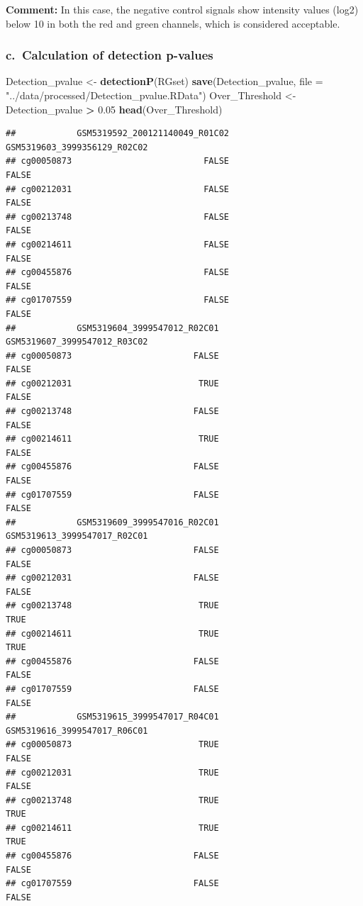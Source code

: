 \documentclass[
  11pt,
]{article}
\newenvironment{Shaded}{\begin{snugshade}}{\end{snugshade}}
\newcommand{\AttributeTok}[1]{\textcolor[rgb]{0.13,0.29,0.53}{#1}}
\newcommand{\FloatTok}[1]{\textcolor[rgb]{0.00,0.00,0.81}{#1}}
\newcommand{\FunctionTok}[1]{\textcolor[rgb]{0.13,0.29,0.53}{\textbf{#1}}}
\newcommand{\NormalTok}[1]{#1}
\newcommand{\OtherTok}[1]{\textcolor[rgb]{0.56,0.35,0.01}{#1}}
\newcommand{\SpecialCharTok}[1]{\textcolor[rgb]{0.81,0.36,0.00}{\textbf{#1}}}
\newcommand{\StringTok}[1]{\textcolor[rgb]{0.31,0.60,0.02}{#1}}
\begin{document}
\textbf{Comment:} In this case, the negative control signals show
intensity values (log2) below 10 in both the red and green channels,
which is considered acceptable.

\subsubsection{c.~Calculation of detection
p-values}\label{c.-calculation-of-detection-p-values}

\begin{Shaded}
\begin{Highlighting}[]
\NormalTok{Detection\_pvalue }\OtherTok{\textless{}{-}} \FunctionTok{detectionP}\NormalTok{(RGset)}
\FunctionTok{save}\NormalTok{(Detection\_pvalue, }\AttributeTok{file =} \StringTok{"../data/processed/Detection\_pvalue.RData"}\NormalTok{)}
\NormalTok{Over\_Threshold }\OtherTok{\textless{}{-}}\NormalTok{ Detection\_pvalue }\SpecialCharTok{\textgreater{}} \FloatTok{0.05}
\FunctionTok{head}\NormalTok{(Over\_Threshold)}
\end{Highlighting}
\end{Shaded}

\begin{verbatim}
##            GSM5319592_200121140049_R01C02 GSM5319603_3999356129_R02C02
## cg00050873                          FALSE                        FALSE
## cg00212031                          FALSE                        FALSE
## cg00213748                          FALSE                        FALSE
## cg00214611                          FALSE                        FALSE
## cg00455876                          FALSE                        FALSE
## cg01707559                          FALSE                        FALSE
##            GSM5319604_3999547012_R02C01 GSM5319607_3999547012_R03C02
## cg00050873                        FALSE                        FALSE
## cg00212031                         TRUE                        FALSE
## cg00213748                        FALSE                        FALSE
## cg00214611                         TRUE                        FALSE
## cg00455876                        FALSE                        FALSE
## cg01707559                        FALSE                        FALSE
##            GSM5319609_3999547016_R02C01 GSM5319613_3999547017_R02C01
## cg00050873                        FALSE                        FALSE
## cg00212031                        FALSE                        FALSE
## cg00213748                         TRUE                         TRUE
## cg00214611                         TRUE                         TRUE
## cg00455876                        FALSE                        FALSE
## cg01707559                        FALSE                        FALSE
##            GSM5319615_3999547017_R04C01 GSM5319616_3999547017_R06C01
## cg00050873                         TRUE                        FALSE
## cg00212031                         TRUE                        FALSE
## cg00213748                         TRUE                         TRUE
## cg00214611                         TRUE                         TRUE
## cg00455876                        FALSE                        FALSE
## cg01707559                        FALSE                        FALSE
\end{verbatim}
\end{document}
